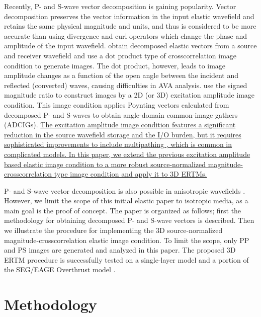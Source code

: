 \documentclass[manuscript,ulem,graphix,revised]{geophysics}
\begin{document}
Recently, P- and S-wave vector decomposition \citep{ma03,zhang07,wenlong_cmp15,wenlong_pv16,zhu17,wenlong17} is gaining popularity. Vector decomposition preserves the vector information in the input elastic wavefield and retains the same physical magnitude and units, and thus is considered to be more accurate than using divergence and curl operators which change the phase and amplitude of the input wavefield. \citet{wang_cl16} obtain decomposed elastic vectors from a source and receiver wavefield and use a dot product type of crosscorrelation image condition to generate images. The dot product, however, leads to image amplitude changes as a function of the open angle between the incident and reflected (converted) waves, causing difficulties in AVA analysis. \citet{wenlong_vct15,wenlong_3d16} use the signed magnitude ratio to construct images by a 2D (or 3D) excitation amplitude image condition. 
This image condition applies Poynting vectors \citep{cerveny01} calculated from decomposed P- and S-waves to obtain angle-domain common-image gathers (ADCIGs). \marginpar{[6]} \uline{The excitation amplitude image condition \mbox{\citep{wenlong_vct15}} features a significant reduction in the source wavefield storage and the I/O burden, but it requires sophisticated improvements to include multipathing \mbox{\citep{jin15}}, which is common in complicated models. In this paper, we extend the previous excitation amplitude based elastic image condition to a more robust source-normalized magnitude-crosscorrelation type image condition and apply it to 3D ERTMs.}

P- and S-wave vector decomposition is also possible in anisotropic wavefields \citep{cheng14,wenlong17}. However, we limit the scope of this initial elastic paper to isotropic media, as a main goal is the proof of concept. The paper is organized as follows; first the methodology for obtaining decomposed P- and S-wave vectors is described. Then we illustrate the procedure for implementing the 3D source-normalized magnitude-crosscorrelation elastic image condition. To limit the scope, only PP and PS images are generated and analyzed in this paper.
The proposed 3D ERTM procedure is successfully tested on a single-layer model and a portion of the SEG/EAGE Overthrust model \citep{aminzadeh94}. 

\section{Methodology}
\end{document}
